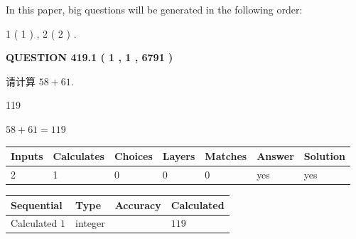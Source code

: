 \documentclass{ctexart}
\begin{document}
   
   
\vspace{0.2in}
   
In this paper, big questions will be generated in the following order: 
   
   
   1 ( 1 )
 ,
   2 ( 2 )
 .
  
\vspace{0.2in}
  
{\textbf{\Large{QUESTION
419.1 
 ( 1 , 1 , 6791 )
}}}
  
  
 
请计算 $ %
58 +  %
61 $.
 
 
 
\noindent{}
 
 

119
 
 
\noindent{}
 
 

 
 
 
\noindent{}
 
 

$ %
58 +  %
61=   %
119$
 
 
\noindent{}
 
 

 
   
   
   
   
\noindent\begin{tabular}{|l|l|l|l|l|l|l|}
 \hline
Inputs & Calculates & Choices & Layers & Matches & Answer & Solution \\ \hline
 2  & 
 1  & 
 0
  & 
 0  & 
 0  & 
  yes & 
  yes 
  \\ \hline
 \end{tabular}
   
   
   
   
\noindent{}
   
   
  
  
\noindent\begin{tabular}{|l|l|l|l|}
\hline
 Sequential & Type & Accuracy & Calculated \\ 
\hline
 
 
  Calculated $  1 $ & integer &  & 
  $ 119 $ 
 \\  \hline  
 \end{tabular}
   
\end{document}
